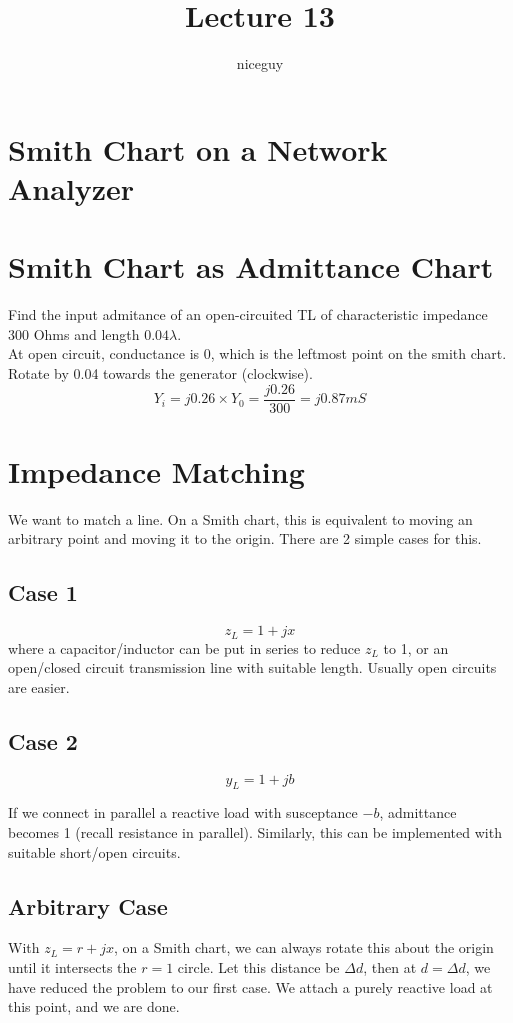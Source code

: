 \documentclass[12pt]{article}
\title{Lecture 13}
\author{niceguy}
\begin{document}
\maketitle

\section{Smith Chart on a Network Analyzer}

\section{Smith Chart as Admittance Chart}

\begin{ex}
    Find the input admitance of an open-circuited TL of characteristic impedance 300 Ohms and length $0.04\lambda$. \\
    At open circuit, conductance is 0, which is the leftmost point on the smith chart. Rotate by 0.04 towards the generator (clockwise).
    $$Y_i = j0.26 \times Y_0 = \frac{j0.26}{300} = j0.87\unit{mS}$$
\end{ex}

\section{Impedance Matching}

We want to match a line. On a Smith chart, this is equivalent to moving an arbitrary point and moving it to the origin. There are 2 simple cases for this.

\subsection{Case 1}

$$z_L = 1+jx$$
where a capacitor/inductor can be put in series to reduce $z_L$ to 1, or an open/closed circuit transmission line with suitable length. Usually open circuits are easier.

\subsection{Case 2}

$$y_L = 1 + jb$$

If we connect in parallel a reactive load with susceptance $-b$, admittance becomes 1 (recall resistance in parallel). Similarly, this can be implemented with suitable short/open circuits.

\subsection{Arbitrary Case}

With $z_L = r+jx$, on a Smith chart, we can always rotate this about the origin until it intersects the $r=1$ circle. Let this distance be $\Delta d$, then at $d = \Delta d$, we have reduced the problem to our first case. We attach a purely reactive load at this point, and we are done.
\end{document}
